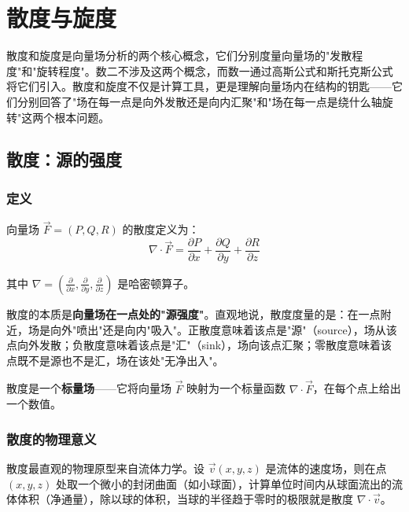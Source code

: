 
\section{散度与旋度}

散度和旋度是向量场分析的两个核心概念，它们分别度量向量场的"发散程度"和"旋转程度"。数二不涉及这两个概念，而数一通过高斯公式和斯托克斯公式将它们引入。散度和旋度不仅是计算工具，更是理解向量场内在结构的钥匙——它们分别回答了"场在每一点是向外发散还是向内汇聚"和"场在每一点是绕什么轴旋转"这两个根本问题。

\subsection{散度：源的强度}

\subsubsection{定义}

向量场 $\vec{F} = (P, Q, R)$ 的散度定义为：
\[
\nabla\cdot\vec{F} = \frac{\partial P}{\partial x} + \frac{\partial Q}{\partial y} + \frac{\partial R}{\partial z}
\]

其中 $\nabla = \left(\frac{\partial}{\partial x}, \frac{\partial}{\partial y}, \frac{\partial}{\partial z}\right)$ 是哈密顿算子。

\begin{essencebox}
散度的本质是\textbf{向量场在一点处的"源强度"}。直观地说，散度度量的是：在一点附近，场是向外"喷出"还是向内"吸入"。正散度意味着该点是"源"（source），场从该点向外发散；负散度意味着该点是"汇"（sink），场向该点汇聚；零散度意味着该点既不是源也不是汇，场在该处"无净出入"。

散度是一个\textbf{标量场}——它将向量场 $\vec{F}$ 映射为一个标量函数 $\nabla\cdot\vec{F}$，在每个点上给出一个数值。
\end{essencebox}

\subsubsection{散度的物理意义}

散度最直观的物理原型来自流体力学。设 $\vec{v}(x,y,z)$ 是流体的速度场，则在点 $(x,y,z)$ 处取一个微小的封闭曲面（如小球面），计算单位时间内从球面流出的流体体积（净通量），除以球的体积，当球的半径趋于零时的极限就是散度 $\nabla\cdot\vec{v}$。

